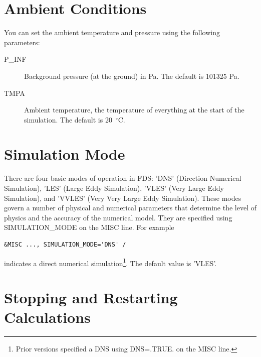 \documentclass[11pt]{book}
\begin{document}
\section{Ambient Conditions}
\label{info:MISC_Basics}

You can set the ambient temperature and pressure using the following parameters:
\begin{description}
\item[{\ct P\_INF}] Background pressure (at the ground) in Pa. The default is 101325 Pa.
\item[{\ct TMPA}] Ambient temperature, the temperature of everything at the start of the simulation. The default is 20~$^\circ$C.
\end{description}


\section{Simulation Mode}
\label{Sim_Mode}

There are four basic modes of operation in FDS: {\ct 'DNS'} (Direction Numerical Simulation), {\ct 'LES'} (Large Eddy Simulation), {\ct 'VLES'} (Very Large Eddy Simulation), and {\ct 'VVLES'} (Very Very Large Eddy Simulation). These modes govern a number of physical and numerical parameters that determine the level of physics and the accuracy of the numerical model. They are specified using {\ct SIMULATION\_MODE} on the {\ct MISC} line. For example
\begin{lstlisting}
&MISC ..., SIMULATION_MODE='DNS' /
\end{lstlisting}
indicates a direct numerical simulation\footnote{Prior versions specified a DNS using {\ct DNS=.TRUE.} on the {\ct MISC} line.}. The default value is {\ct 'VLES'}.


\section{Stopping and Restarting Calculations}
\label{info:restart}
\end{document}
